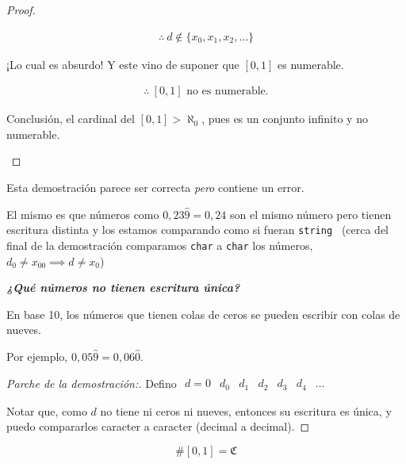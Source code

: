 \begin{proof}
\begin{enumerate}
            \begin{gather*}
                \therefore ~ d \notin \{ x_0, x_1, x_2, \dots \}
            \end{gather*}
            \smallskip

            ¡Lo cual es absurdo! Y este vino de suponer que $[0,1]$ es
            numerable.

            \begin{gather*}
                \therefore ~ [0,1] \text{ no es numerable.}
            \end{gather*}
            \smallskip

            Conclusión, el cardinal del $[0,1] > \aleph_0$, pues es un
            conjunto infinito y no numerable.
    \end{enumerate}
\end{proof}

Esta demostración parece ser correcta \textit{pero} contiene un error.

%
El mismo es que números como $0,23\widehat{9} = 0,24$ son el mismo número 
pero tienen escritura distinta y los estamos comparando como si fueran 
\Verb+string + (cerca del final de la demostración comparamos \Verb+char+ a 
\Verb+char+ los números, $d_0 \neq x_{00} \implies d \neq x_0$)

\medskip
\textit{\textbf{¿Qué números no tienen escritura única?}}

En base 10, los números que tienen colas de ceros se pueden escribir con colas
de nueves.

Por ejemplo, $0,05\widehat{9} = 0,06\widehat{0}$.

\begin{proof}[Parche de la demostración:] \phantom{.}

    Defino $\begin{matrix} 
        d = 0 & d_0 & d_1 & d_2 & d_3 & d_4 & \dots 
    \end{matrix}$ 

    Notar que, como $d$ no tiene ni ceros ni nueves, entonces su escritura es
    única, y puedo compararlos caracter a caracter (decimal a decimal).

\end{proof}

\begin{definicion}{}{}
    \[ \# [0,1] = \mathfrak{C} \]
\end{definicion}

